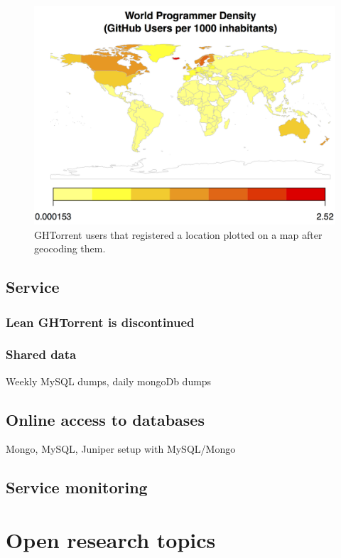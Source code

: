 \documentclass{sig-alternate}
\begin{document}
\begin{figure}
  \begin{center}
    \includegraphics[scale=0.2]{dev-map.png}
  \end{center}
  \caption{GHTorrent users that registered a location plotted on a map after
  geocoding them.}
  \label{fig:dev-map}
\end{figure}

\subsection{Service}

\subsubsection{Lean GHTorrent is discontinued}


\subsubsection{Shared data}
Weekly MySQL dumps, daily mongoDb dumps
\subsection{Online access to databases}
Mongo, MySQL, Juniper setup with MySQL/Mongo
\subsection{Service monitoring}

\section{Open research topics}
\end{document}

